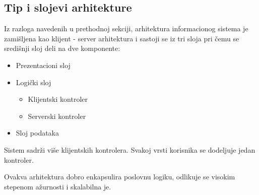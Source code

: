 \subsection{Tip i slojevi arhitekture}

Iz razloga navedenih u prethodnoj sekciji, arhitektura informacionog sistema je zamišljena kao klijent - server arhitektura i sastoji se iz tri sloja pri čemu se središnji sloj deli na dve komponente: 
\begin{itemize}
    \item Prezentacioni sloj
    \item Logički sloj
    \begin{itemize}
        \item Klijentski kontroler 
        \item Serverski kontroler
    \end{itemize}
    \item Sloj podataka
\end{itemize}

 Sistem sadrži više klijentskih kontrolera. Svakoj vrsti korisnika se dodeljuje jedan kontroler.
 
 Ovakva arhitektura dobro enkapsulira poslovnu logiku, odlikuje se visokim stepenom ažurnosti i skalabilna je.
 





